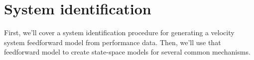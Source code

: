 
\chapter{System identification}

First, we'll cover a system identification procedure for generating a velocity
system feedforward model from performance data. Then, we'll use that feedforward
model to create state-space models for several common mechanisms.

\renewcommand*{\chapterpath}{\partpath/system-identification}




